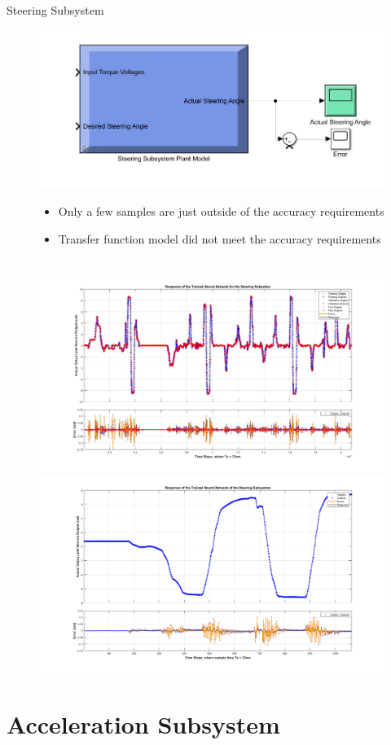 \documentclass{beamer}
\begin{document}
\begin{frame}{Steering Subsystem}
	\begin{block}{}
  		\begin{figure}[H]
  			\centering \includegraphics[width=.45\linewidth , height=.37\textheight]{figs/img/steeringSimulinkBlock.jpg}\quad%
			\centering \begin{minipage}[b][0.4\textheight][c]{.45\linewidth}  \begin{itemize}
			\item Only a few samples are just outside of the accuracy requirements
			\item Transfer function model did not meet the accuracy requirements
			\end{itemize} \end{minipage}\\[1em]
			\centering \includegraphics[width=.45\linewidth , height=.37\textheight]{figs/img/steeringNeuralNetworkTrainedOutput.jpg}\quad%
			\centering \includegraphics[width=.45\linewidth , height=.37\textheight]{figs/img/steeringNeuralNetworkTrainedOutput2.jpg}
  		\end{figure}
	\end{block}
\end{frame}



\section{Acceleration Subsystem}
\end{document}
